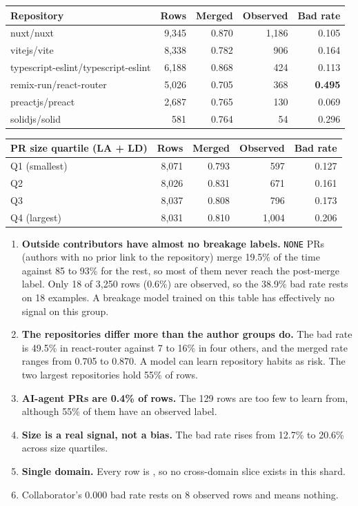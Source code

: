 \documentclass[11pt,a4paper]{article}
\newcommand{\code}[1]{\texttt{\detokenize{#1}}}
\begin{document}
\begin{center}
\small
\begin{tabular}{@{}lrrrr@{}}
\toprule
Repository & Rows & Merged & Observed & Bad rate \\
\midrule
nuxt/nuxt & 9,345 & 0.870 & 1,186 & 0.105 \\
vitejs/vite & 8,338 & 0.782 & 906 & 0.164 \\
typescript-eslint/typescript-eslint & 6,188 & 0.868 & 424 & 0.113 \\
remix-run/react-router & 5,026 & 0.705 & 368 & \textbf{0.495} \\
preactjs/preact & 2,687 & 0.765 & 130 & 0.069 \\
solidjs/solid & 581 & 0.764 & 54 & 0.296 \\
\bottomrule
\end{tabular}
\end{center}

\begin{center}
\small
\begin{tabular}{@{}lrrrr@{}}
\toprule
PR size quartile (LA + LD) & Rows & Merged & Observed & Bad rate \\
\midrule
Q1 (smallest) & 8,071 & 0.793 & 597 & 0.127 \\
Q2 & 8,026 & 0.831 & 671 & 0.161 \\
Q3 & 8,037 & 0.808 & 796 & 0.173 \\
Q4 (largest) & 8,031 & 0.810 & 1,004 & 0.206 \\
\bottomrule
\end{tabular}
\end{center}

\begin{enumerate}
  \item \textbf{Outside contributors have almost no breakage labels.} \texttt{NONE} PRs (authors with no prior link to the repository) merge 19.5\% of the time against 85 to 93\% for the rest, so most of them never reach the post-merge label. Only 18 of 3,250 rows (0.6\%) are observed, so the 38.9\% bad rate rests on 18 examples. A breakage model trained on this table has effectively no signal on this group.
  \item \textbf{The repositories differ more than the author groups do.} The bad rate is 49.5\% in react-router against 7 to 16\% in four others, and the merged rate ranges from 0.705 to 0.870. A model can learn repository habits as risk. The two largest repositories hold 55\% of rows.
  \item \textbf{AI-agent PRs are 0.4\% of rows.} The 129 rows are too few to learn from, although 55\% of them have an observed label.
  \item \textbf{Size is a real signal, not a bias.} The bad rate rises from 12.7\% to 20.6\% across size quartiles.
  \item \textbf{Single domain.} Every row is \code{web-ts}, so no cross-domain slice exists in this shard.
  \item Collaborator's 0.000 bad rate rests on 8 observed rows and means nothing.
\end{enumerate}
\end{document}
